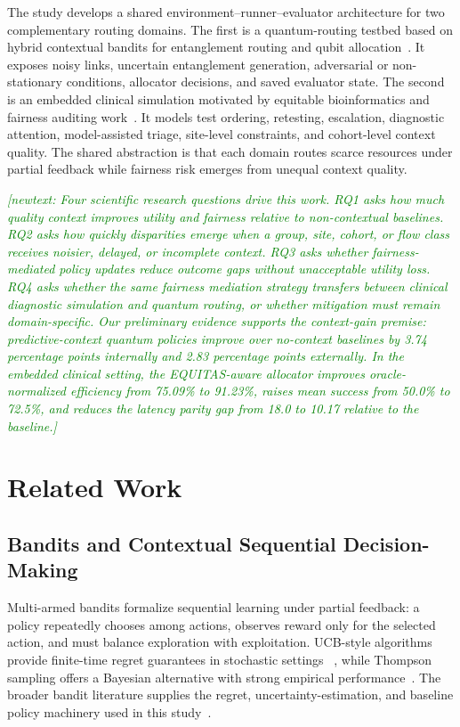 \documentclass[conference]{IEEEtran}
\newcommand{\newtext}[1]{\textcolor{green}{{\it [newtext: #1]}}}
\begin{document}
The study develops a shared environment--runner--evaluator architecture for
two complementary routing domains. The first is a quantum-routing testbed
based on hybrid contextual bandits for entanglement routing and qubit
allocation~\cite{garcia2026threat_aware_quantum_routing}. It exposes noisy
links, uncertain entanglement generation, adversarial or non-stationary
conditions, allocator decisions, and saved evaluator state. The second is an
embedded clinical simulation motivated by equitable bioinformatics and
fairness auditing work~\cite{garcia2025equitable_bioinformatics}. It models
test ordering, retesting, escalation, diagnostic attention, model-assisted
triage, site-level constraints, and cohort-level context quality. The shared
abstraction is that each domain routes scarce resources under partial feedback
while fairness risk emerges from unequal context quality.

\newtext{Four scientific research questions drive this work. RQ1 asks how much quality
context improves utility and fairness relative to non-contextual baselines.
RQ2 asks how quickly disparities emerge when a group, site, cohort, or flow
class receives noisier, delayed, or incomplete context. RQ3 asks whether
fairness-mediated policy updates reduce outcome gaps without unacceptable
utility loss. RQ4 asks whether the same fairness mediation strategy transfers
between clinical diagnostic simulation and quantum routing, or whether
mitigation must remain domain-specific. Our preliminary evidence supports the
context-gain premise: predictive-context quantum policies improve over
no-context baselines by 3.74 percentage points internally and 2.83 percentage
points externally. In the embedded clinical setting, the EQUITAS-aware
allocator improves oracle-normalized efficiency from 75.09\% to 91.23\%,
raises mean success from 50.0\% to 72.5\%, and reduces the latency parity gap
from 18.0 to 10.17 relative to the baseline.}

\section{Related Work}
\subsection{Bandits and Contextual Sequential Decision-Making}
Multi-armed bandits formalize sequential learning under partial feedback:
a policy repeatedly chooses among actions, observes reward only for the
selected action, and must balance exploration with exploitation. UCB-style
algorithms provide finite-time regret guarantees in stochastic settings
~\cite{auer2002finite}, while Thompson sampling offers a Bayesian alternative
with strong empirical performance~\cite{russo2018tutorial}. The broader
bandit literature supplies the regret, uncertainty-estimation, and baseline
policy machinery used in this study~\cite{lattimore2020bandit}.
\end{document}
